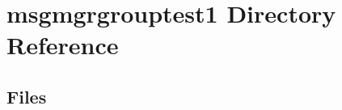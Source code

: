 \section{msgmgrgrouptest1 Directory Reference}
\label{dir_28b3bcfbd7f121f8017062f4154e8e9f}
\subsection*{Files}
\begin{DoxyCompactItemize}
\end{DoxyCompactItemize}

